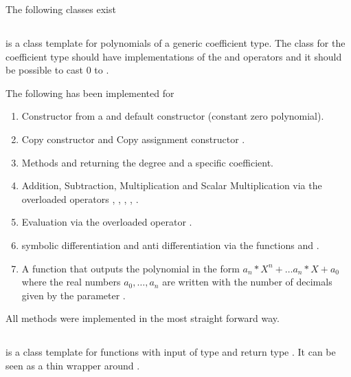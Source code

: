 		The following classes exist
		
		\subsection{\poly} 
			\textbf{} is a class template for polynomials of a generic coefficient type. 
			The class for the coefficient type should have implementations of the \code{*} and \code{+} operators
			and it should be possible to cast $0$ to .

			The following has been implemented for \poly
			\begin{enumerate}
				\item Constructor from a  and default constructor (constant zero polynomial).
				\item Copy constructor  and Copy assignment constructor .
				\item Methods  and  returning the degree and a specific coefficient.
				\item Addition, Subtraction, Multiplication and Scalar Multiplication via the overloaded operators \code{+}, \code{-}, 	\code{*}, \code{+=}, \code{*=}.
				\item Evaluation via the overloaded operator \code{()}.
				\item symbolic differentiation and anti differentiation via the functions  and .
				\item A function  that outputs the polynomial
				in the form $a_n*X^n+ \dots a_n*X + a_0$ where the real numbers $a_0, \dots, a_n$ are written with the number of decimals given by the parameter .
			\end{enumerate}
			All methods were implemented in the most straight forward way. 
		\subsection{\func}
			\textbf{} is a class template for functions with input 
			of type  and return type . 
      It can be seen as a thin wrapper around .
			
